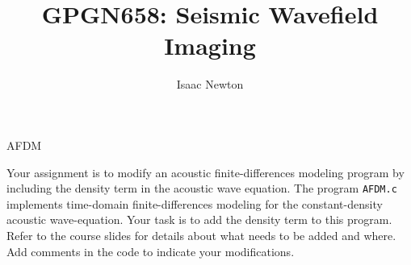 \author{Isaac Newton}
\title{GPGN658: Seismic Wavefield Imaging}{AFDM}

Your assignment is to modify an acoustic finite-differences modeling
program by including the density term in the acoustic wave equation.
The program \texttt{AFDM.c} implements time-domain finite-differences
modeling for the constant-density acoustic wave-equation. Your task is
to add the density term to this program. Refer to the course slides
for details about what needs to be added and where. Add comments in
the code to indicate your modifications.






%



